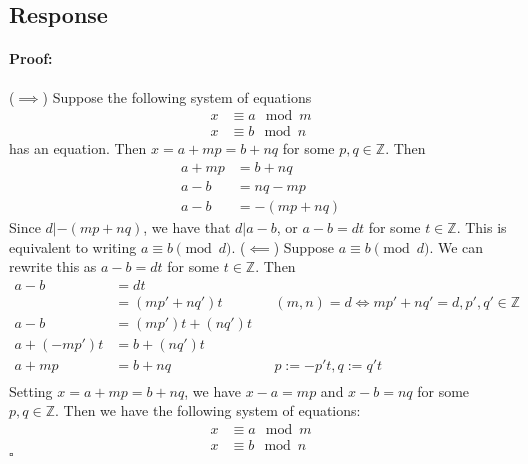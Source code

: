 \documentclass [12pt] {article}
\newcommand{\Z}{\mathbb{Z}}
\newenvironment{proof}{\paragraph{Proof:}}{\hfill$\square$}
\begin{document}
\subsection*{Response}
\begin{proof}
    ($\implies$) Suppose the following system of equations
    \begin{align*}
        x &\equiv a \mod m \\
        x &\equiv b \mod n
    \end{align*}
    has an equation. Then $x = a + mp = b + nq$ for some 
    $p, q \in \Z$. Then
    \begin{align*}
        a + mp &= b + nq \\
        a - b &= nq - mp \\
        a - b &= -(mp + nq)
    \end{align*}
    Since $d | -(mp + nq)$, we have that $d | a - b$, or $a - b = dt$ for some $t \in \Z$. This is
    equivalent to writing $a \equiv b \pmod{d}$.
    \newline
    ($\impliedby$) Suppose $a \equiv b \pmod{d}$. We can rewrite this as $a - b = dt$ for some 
    $t \in \Z$. Then 
    \begin{align*}
        a - b &= dt \\
              &= (mp' + nq')t && (m, n) = d \iff mp' + nq' = d, p', q' \in \Z \\
        a - b &= (mp')t + (nq')t \\
        a + (-mp')t &= b + (nq')t \\
        a + mp &= b + nq && p := -p't, q := q't \\
    \end{align*}
    Setting $x = a + mp = b + nq$, we have $x - a = mp$ and $x - b = nq$ for some $p, q \in \Z$.
    Then we have the following system of equations:
    \begin{align*}
        x &\equiv a \mod m \\
        x &\equiv b \mod n
    \end{align*}
\end{proof}
\newpage
\end{document}
